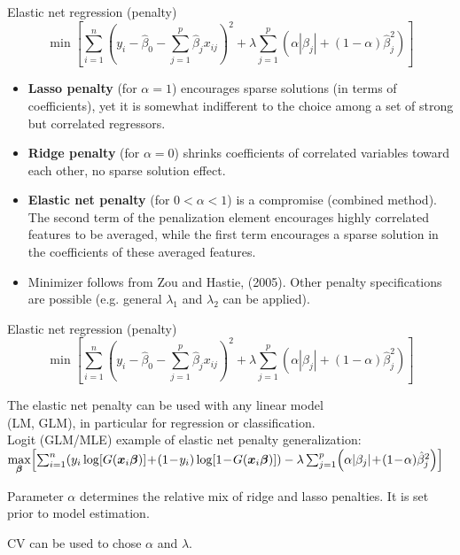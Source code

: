\documentclass{beamer}
\begin{document}
\begin{frame}{Elastic net regression (penalty)}
$$\min \left[ \sum_{i=1}^n \left(y_i - \hat{\beta}_0 
         - \sum_{j=1}^p  \hat{\beta}_j x_{ij} \right)^2 
         \! + \lambda \sum_{j=1}^p 
         \left( \alpha |\beta_j| + (1-\alpha) \hat{\beta}_j^2 \right) \right]
$$
\small
\begin{itemize}
\item \textbf{Lasso penalty} (for $\alpha = 1$) encourages sparse solutions (in terms of coefficients), yet it is somewhat indifferent to the choice among a set of strong but correlated regressors.
\smallskip
\item \textbf{Ridge penalty} (for $\alpha = 0$) shrinks coefficients of correlated variables toward each other, no sparse solution effect.
\smallskip
\item \textbf{Elastic net penalty} (for $0 < \alpha < 1$) is a compromise (combined method). The second term of the penalization element encourages highly correlated features to be averaged, while
the first term encourages a sparse solution in the coefficients of these averaged features.
\item Minimizer follows from Zou and Hastie, (2005). Other penalty specifications are possible (e.g. general $\lambda_1$ and $\lambda_2$ can be applied).
\end{itemize}
\end{frame}
\begin{frame}{Elastic net regression (penalty)}
$$\min \left[ \sum_{i=1}^n \left(y_i - \hat{\beta}_0 
         - \sum_{j=1}^p  \hat{\beta}_j x_{ij} \right)^2 
         \! + \lambda \sum_{j=1}^p 
         \left( \alpha |\beta_j| + (1-\alpha) \hat{\beta}_j^2 \right) \right]
$$
\begin{itemize}
\item The elastic net penalty can be used with any linear model \\(LM, GLM), in particular for regression or classification.\\
Logit (GLM/MLE) example of elastic net penalty generalization:\\
\footnotesize{$\underset{\bm{\beta}}{\textnormal{max}}\!
\left[
\sum_{i=1}^n \!\left( y_i \log [G(\bm{x}_i\bm{\beta})] \!+\! 
(1\!-\!y_i) \log [1\!-\!G(\bm{x}_i\bm{\beta})]
\right)
- \lambda \sum_{j=1}^p \!\left( \alpha |\beta_j|\!+\!(1\!-\!\alpha) \hat{\beta}_j^2 \right)
\right]$}
\smallskip
\normalsize{
\item Parameter $\alpha$ determines the relative mix of ridge and lasso penalties. It is set prior to model estimation.
\medskip
\item CV can be used to chose $\alpha$ and $\lambda$.}
\end{itemize}
\end{frame}
\end{document}
